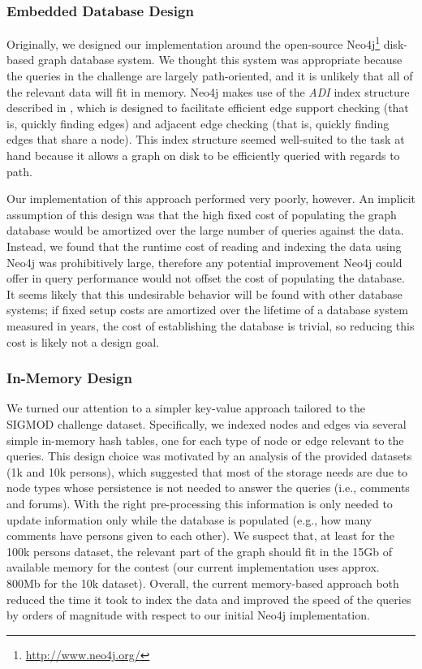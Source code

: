 \documentclass{article}
\begin{document}
\subsubsection{Embedded Database Design}
Originally, we designed our implementation around the open-source
Neo4j\footnote{\url{http://www.neo4j.org/}} disk-based graph database
system.  We thought this system was appropriate because the queries in
the challenge are largely path-oriented, and it is unlikely that all
of the relevant data will fit in memory.  Neo4j makes use of the
\emph{ADI} index structure \cite[Chapter~6]{IanRobinson:2013ul}
described in \cite{wang2004scalable}, which is designed to facilitate
efficient edge support checking (that is, quickly finding edges) and
adjacent edge checking (that is, quickly finding edges that share a
node).  This index structure seemed well-suited to the task at hand
because it allows a graph on disk to be efficiently queried with
regards to path.

Our implementation of this approach performed very poorly, however.
An implicit assumption of this design was that the high fixed cost of
populating the graph database would be amortized over the large number
of queries against the data.  Instead, we found that the runtime cost 
of reading and indexing the data using Neo4j was prohibitively large,
therefore any potential improvement Neo4j could offer in query performance
would not offset the cost of populating the database.
It seems likely that this undesirable behavior will be found
with other database systems; if fixed setup costs are amortized over
the lifetime of a database system measured in years, the cost of
establishing the database is trivial, so reducing this cost is likely
not a design goal.

\subsubsection{In-Memory Design}
We turned our attention to a simpler key-value approach tailored 
to the SIGMOD challenge dataset. 
Specifically, we indexed nodes and edges via several simple 
in-memory hash tables, one for each type of node or edge 
relevant to the queries. 
This design choice was motivated by an analysis of the provided 
datasets (1k and 10k persons), which suggested that most of the
storage needs are due to node types whose persistence is not needed to 
answer the queries (i.e., comments and forums). With the right 
pre-processing this information is only needed to update information 
only while the database is populated
(e.g., how many comments have persons given to each other).
We suspect that, at least for the 100k persons dataset, the 
relevant part of the graph should fit in the 15Gb of available memory
for the contest (our current implementation uses approx. 800Mb for 
the 10k dataset). Overall, the current memory-based approach 
both reduced the time it took to index the data and improved the speed 
of the queries by orders of magnitude with respect to our initial
Neo4j implementation.
\end{document}
